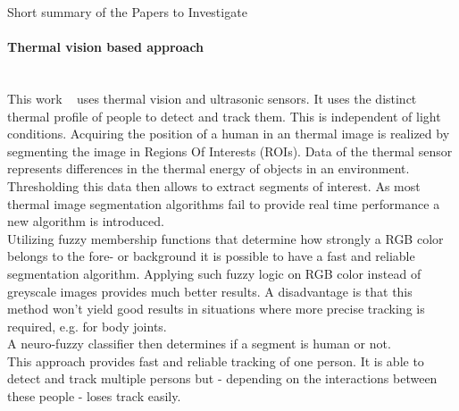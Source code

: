 \documentclass[a4paper,oneside,10pt,DIV12,headsepline,footexclude,headexclude]{scrartcl}
\begin{document}
\begin{section}{Short summary of the Papers to Investigate}
\paragraph{Thermal vision based approach}
\mbox{} \\
This work ~\cite{ciric2013computationally} uses thermal vision and ultrasonic
sensors. 
It uses the distinct thermal profile of people to detect and track them. This is
independent of light conditions.
Acquiring the position of a human in an thermal image is realized by segmenting
the image in Regions Of Interests (ROIs). Data of the thermal sensor 
represents differences in the thermal energy of objects in an environment.
Thresholding this data then allows to extract segments of interest. 
As most thermal image segmentation algorithms fail to provide real time performance
a new algorithm is introduced.\\
Utilizing fuzzy membership functions that determine how strongly a RGB color 
belongs to the fore- or background it is possible to have a fast and reliable
segmentation algorithm. Applying such fuzzy logic on RGB color instead of greyscale
images provides much better results. A disadvantage is that this method won't yield
good results in situations where more precise tracking is required, e.g. 
for body joints.\\
A neuro-fuzzy classifier then determines if a segment is human or not.\\
This approach provides fast and reliable tracking of one person.
It is able to detect and track multiple persons but - depending on the interactions
between these people - loses track easily.




\end{section}
\end{document}
